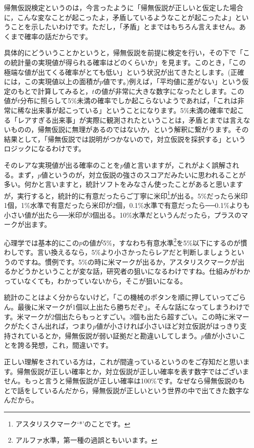 \documentclass{ltjsbook}
\begin{document}
帰無仮説検定というのは，今言ったように「帰無仮説が正しいと仮定した場合に，こんな変なことが起こったよ，矛盾しているようなことが起こったよ」ということを示したいわけです。ただし，「矛盾」とまではもちろん言えません。あくまで確率の話だからです。

具体的にどういうことかというと，帰無仮説を前提に検定を行い，その下で「この統計量の実現値が得られる確率はどのくらいか」を見ます。このとき，「この極端な値が出てくる確率がとても低い」という状況が出てきたとします。(正確には，この実現値以上の面積が$p$値です。)例えば，「平均値に差がない」という仮定のもとで計算してみると，$t$の値が非常に大きな数字になったとします。この値が$t$分布に照らして5\%未満の確率でしか起こらないようであれば，「これは非常に稀な出来事が起こっている」ということになります。5\%未満の確率で起こる「レアすぎる出来事」が実際に観測されたということは，矛盾とまでは言えないものの，帰無仮説に無理があるのではないか，という解釈に繋がります。その結果として，「帰無仮説では説明がつかないので，対立仮説を採択する」というロジックになるわけです。

そのレアな実現値が出る確率のことを$p$値と言いますが，これがよく誤解される。まず，$p$値というのが，対立仮説の強さのスコアだみたいに思われることが多い。何かと言いますと，統計ソフトをみなさん使ったことがあると思いますが，実行すると，統計的に有意だったらご丁寧に米印\footnote{アスタリスクマーク`*'のことです。}が出る。5\%だったら米印1個，1\%水準で有意だったら米印が2個，0.1\%水準で有意だったら──0.1\%よりも小さい値が出たら──米印が3個出る。10\%水準だというんだったら，プラスのマークが出ます。

心理学では基本的にこの$p$の値が5\%，すなわち有意水準\footnote{アルファ水準，第一種の過誤ともいいます。}を5\%以下にするのが慣わしです。言い換えるなら，5\%より小さかったらレアだと判断しましょうというのですね。慣例です。5\%の時に米マークが出るか，アスタリスクマークが出るかどうかということが変な話，研究者の狙いになるわけですね。仕組みがわかっていなくても，わかっていないから，そこが狙いになる。

統計のことはよく分からないけど，「この機械のボタンを順に押していってごらん。最後に米マークが1個以上出たら勝ちだぞ」。そんな話になってしまうわけです。米マークが2個出たらもっとすごい。3個も出たら超すごい。この時に米マークがたくさん出れば，つまり$p$値が小さければ小さいほど対立仮説がはっきり支持されているとか，帰無仮説が弱い証拠だと勘違いしてしまう。$p$値が小さいことを誇る発想，これ，間違いです。

正しい理解をされている方は，これが間違っているというのをご存知だと思います。帰無仮説が正しい確率とか，対立仮説が正しい確率を表す数字ではございません。もっと言うと帰無仮説が正しい確率は100\%です。なぜなら帰無仮説のもとで話をしているんだから，帰無仮説が正しいという世界の中で出てきた数字なんだから。
\end{document}
